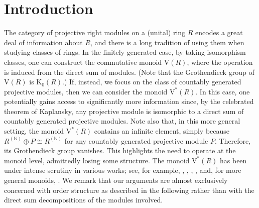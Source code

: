 \documentclass[11pt]{amsart}
\numberwithin{equation}{section}
\theoremstyle{definition}
\newcommand{\K}{\mathrm{K}}
\newcommand{\V}{\mathrm{V}}
\theoremstyle{plain}
\theoremstyle{definition}
\begin{document}
\maketitle





\section{Introduction}
The category of projective right modules on a
(unital) ring $R$ encodes a great deal of information about $R$, and there is a long tradition of using them when studying classes of rings. In the finitely generated case, by taking isomorphism classes, one can construct the commutative monoid $\V(R)$, where the operation is induced from the direct sum of modules. (Note that the Grothendieck group of $\V(R)$ is $\K_0(R)$.) If, instead, we focus on the class of countably generated projective modules, then we can consider the monoid $\V^*(R)$. In this case, one potentially gains access to significantly more information since, by the celebrated theorem of Kaplansky, any projective module is isomorphic to a direct sum of countably generated projective modules. Note also that, in this more general setting, the monoid $\V^*(R)$ contains an infinite element,  simply because $R^{(\mathbb N)}\oplus P\cong R^{(\mathbb N)}$ for any countably generated projective module $P$. Therefore, its Grothendieck group vanishes. This highlights the need to operate at the monoid level, admittedly losing some structure.
The monoid $\V^*(R)$ has been under intense scrutiny in various works; see, for example, \cite{HerPri2010}, \cite{HerPri2014}, \cite{HerPri2014JAlg}, \cite{HerPriWie2023}, and, for more general monoids, \cite{nazsme24monoid}. We remark that our arguments are almost exclusively concerned with order structure as described in the following rather than with the direct sum decompositions of the modules involved.
\end{document}
